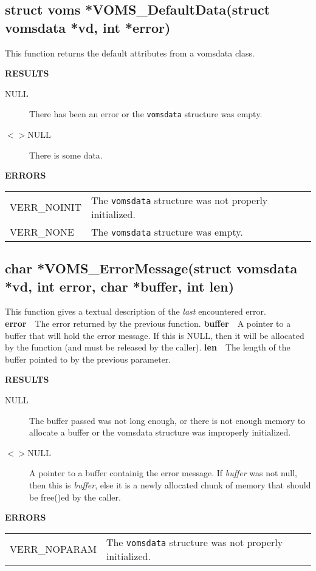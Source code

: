 \documentclass[a4paper]{book}
\newcommand{\errors}{\noindent \textbf{ERRORS}\newline}
\newcommand{\result}{\noindent \textbf{RESULTS}\newline}
\newcommand{\parameter}[1]{\newline\textbf{#1}\ \ }
\begin{document}
\subsection{struct voms *VOMS\_DefaultData(struct vomsdata *vd, int
  *error)}

This function returns the default attributes from a vomsdata class.

\result
\begin{description}
\item[NULL] There has been an error or the \verb|vomsdata| structure
  was empty.
\item[$<>$NULL] There is some data.
\end{description}

\errors
\bigskip\begin{tabular}{lp{3in}}
VERR\_NOINIT & The \verb|vomsdata| structure was not properly
initialized.\\
VERR\_NONE   & The \verb|vomsdata| structure was empty.\\
\end{tabular}

\subsection{char *VOMS\_ErrorMessage(struct vomsdata *vd, int error, 
  char *buffer, int len)}

This function gives a textual description of the \emph{last}
encountered error.
\parameter{error}{The error returned by the previous function.}
\parameter{buffer}{A pointer to a buffer that will hold the error
  message.  If this is NULL, then it will be allocated by the function
  (and must be released by the caller).}
\parameter{len}{The length of the buffer pointed to by the previous
  parameter.}

\result
\begin{description}
\item[NULL] The buffer passed was not long enough, or there is not
  enough memory to allocate a buffer or the vomsdata structure was
  improperly initialized. 
\item[$<>$NULL] A pointer to a buffer containig the error message.  If
  \emph{buffer} was not null, then this is \emph{buffer}, else it is a
  newly allocated chunk of memory that should be free()ed by the
  caller.
\end{description}

\errors
\bigskip\begin{tabular}{lp{3in}}
VERR\_NOPARAM & The \verb|vomsdata| structure was not properly
initialized.\\
\end{tabular}
\end{document}
